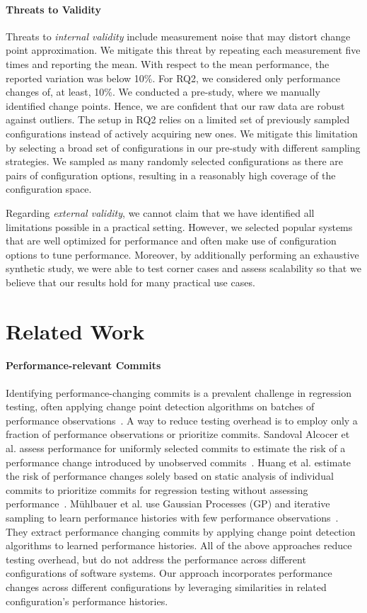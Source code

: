 \documentclass[sigconf]{acmart}
\begin{document}
	\paragraph{Threats to Validity}
	Threats to \emph{internal validity} include measurement noise that may distort change point approximation. We mitigate this threat by repeating each measurement five times and reporting the mean. With respect to the mean performance, the reported variation was below 10\%. For RQ2, we considered only performance changes of, at least, 10\%. We conducted a pre-study, where we manually identified change points.
	Hence, we are confident that our raw data are robust against outliers. The setup in RQ2 relies on a limited set of previously sampled configurations instead of actively acquiring new ones. We mitigate this limitation by selecting a broad set of configurations in our pre-study with different sampling strategies. We sampled as many randomly selected configurations as there are pairs of configuration options, resulting in a reasonably high coverage of the configuration space. 
	
	Regarding \emph{external validity}, we cannot claim that we have identified all limitations possible in a practical setting. However, we selected popular systems that are well optimized for performance and often make use of configuration options to tune performance. Moreover, by additionally performing an exhaustive synthetic study, we were able to test corner cases and assess scalability so that we believe that our results hold for many practical use cases.
	
	\section{Related Work}\label{sec:rw}
	\paragraph{Performance-relevant Commits} Identifying performance-changing commits is a prevalent challenge in regression testing, often applying change point detection algorithms on batches of performance observations~\cite{cityIdentifying2014,daly_industry_2020}. A way to reduce testing overhead is to employ only a fraction of performance observations or prioritize commits. Sandoval Alcocer et al. assess performance for uniformly selected commits to estimate the risk of a performance change introduced by unobserved commits~\cite{sandoval_alcocer_learning_2016,alcocer_prioritizing_2020}. Huang et al. estimate the risk of performance changes solely based on static analysis of individual commits to prioritize commits for regression testing without assessing performance~\cite{huang_performance_2014}. Mühlbauer et al. use Gaussian Processes (GP) and iterative sampling to learn performance histories with few performance observations~\cite{muhlbauer_accurate_2019}. They extract performance changing commits by applying change point detection algorithms to learned performance histories. All of the above approaches reduce testing overhead, but do not address the performance across different configurations of software systems. Our approach incorporates performance changes across different configurations by leveraging similarities in related configuration's performance histories.
\end{document}
